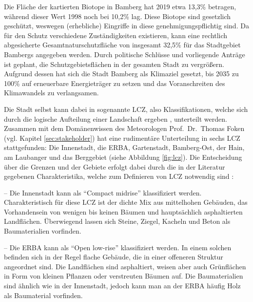 Die Fläche der kartierten Biotope in Bamberg hat 2019 etwa 13,3\% betragen, während dieser Wert 1998 noch bei 10,2\% lag. Diese Biotope sind gesetzlich geschützt, weswegen (erhebliche) Eingriffe in diese genehmigungspflichtig sind. Da für den Schutz verschiedene Zuständigkeiten existieren, kann eine rechtlich abgesicherte Gesamtnaturschutzfläche von insgesamt 32,5\% für das Stadtgebiet Bambergs angegeben werden. Durch politische Schlüsse und vorliegende Anträge ist geplant, die Schutzgebietsflächen in der gesamten Stadt zu vergrößern. \\ Aufgrund dessen hat sich die Stadt Bamberg als Klimaziel gesetzt, bis 2035 zu 100\% auf erneuerbare Energieträger zu setzen und das Voranschreiten des Klimawandels zu verlangsamen.

Die Stadt selbst kann dabei in sogenannte \ac{LCZ}, also Klassifikationen, welche sich durch die logische Aufteilung einer Landschaft ergeben \cite{stewart2011local}, unterteilt werden. Zusammen mit dem Domänenwissen des Meteorologen Prof.\ Dr.\ Thomas Foken (vgl. Kapitel \ref{sec:stakeholder}) hat eine rudimentäre Unterteilung in sechs \ac{LCZ} stattgefunden: Die Innenstadt, die ERBA, Gartenstadt, Bamberg-Ost, der Hain, am Laubanger und das Berggebiet (siehe Abbildung \ref{fig:lcz}). Die Entscheidung über die Grenzen und der Gebiete erfolgt dabei durch die in der Literatur gegebenen Charakteristika, welche zum Definieren von \ac{LCZ} notwendig sind \cite{oke2004initial, stewart2012local}:

 -- Die Innenstadt kann als \enquote{Compact midrise} klassifiziert werden. Charakteristisch für diese \ac{LCZ} ist der dichte Mix aus mittelhohen Gebäuden, das Vorhandensein von wenigen bis keinen Bäumen und hauptsächlich asphaltierten Landflächen. Überwiegend lassen sich Steine, Ziegel, Kacheln und Beton als Baumaterialien vorfinden.

 -- Die ERBA kann als \enquote{Open low-rise} klassifiziert werden. In einem solchen befinden sich in der Regel flache Gebäude, die in einer offeneren Struktur angeordnet sind. Die Landflächen sind asphaltiert, weisen aber auch Grünflächen in Form von kleinen Pflanzen oder verstreuten Bäumen auf. Die Baumaterialien sind ähnlich wie in der Innenstadt, jedoch kann man an der ERBA häufig Holz als Baumaterial vorfinden.

